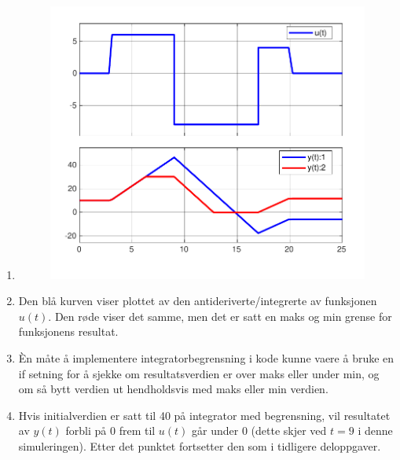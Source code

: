 \documentclass[answers,11pt]{exam}
\begin{document}
\begin{enumerate}[label=\alph*)]
\begin{tcolorbox}
    \begin{enumerate}[label=d\arabic*)]
      \item
            \parbox{\textwidth}{
              \begin{figure}[H]
                \centering
                \hspace{0mm}\scalebox{0.75}
                {\includegraphics{figurer/2d_svar.pdf}}
                \label{fig:2d1}
              \end{figure}
            }

      \item
            Den blå kurven viser plottet av den antideriverte/integrerte av
            funksjonen $u(t)$. Den røde viser det samme, men det er satt en
            maks og min grense for funksjonens resultat.

      \item
            Èn måte å implementere integratorbegrensning i kode kunne vaere å
            bruke en if setning for å sjekke om resultatsverdien er over maks
            eller under min, og om så bytt verdien ut hendholdsvis med maks
            eller min verdien.

      \item
            Hvis initialverdien er satt til 40 på integrator med begrensning,
            vil resultatet av $y(t)$ forbli på 0 frem til $u(t)$ går under 0
            (dette skjer
            ved $t=9$ i denne simuleringen). Etter det punktet fortsetter den
            som i tidligere deloppgaver.


\end{enumerate}
\end{tcolorbox}
\end{enumerate}
\end{document}
